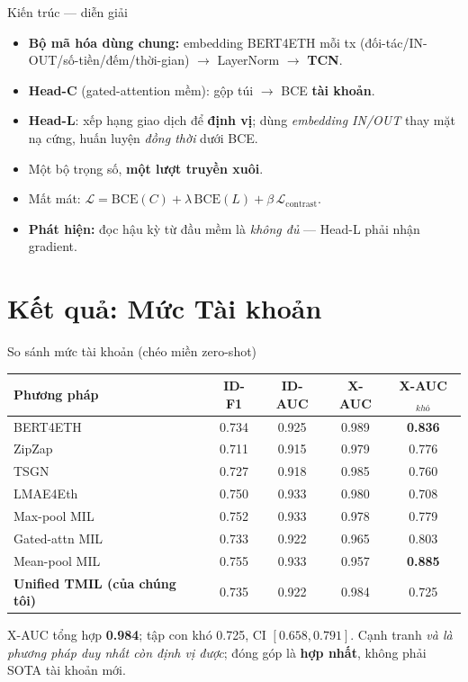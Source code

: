 \documentclass[aspectratio=169,10pt]{beamer}
\begin{document}
\begin{frame}{Kiến trúc --- diễn giải}
\begin{itemize}
\item \textbf{Bộ mã hóa dùng chung:} embedding BERT4ETH mỗi tx (đối-tác/IN-OUT/số-tiền/đếm/thời-gian) $\to$ LayerNorm $\to$ \textbf{TCN}.
\item \textbf{Head-C} (gated-attention mềm): gộp túi $\to$ BCE \textbf{tài khoản}.
\item \textbf{Head-L}: xếp hạng giao dịch để \textbf{định vị}; dùng \emph{embedding IN/OUT} thay mặt nạ cứng, huấn luyện \emph{đồng thời} dưới BCE.
\item Một bộ trọng số, \textbf{một lượt truyền xuôi}.
\item Mất mát: $\mathcal{L}=\mathrm{BCE}(C)+\lambda\,\mathrm{BCE}(L)+\beta\,\mathcal{L}_{\text{contrast}}$.
\item \textbf{Phát hiện:} đọc hậu kỳ từ đầu mềm là \emph{không đủ} --- Head-L phải nhận gradient.
\end{itemize}
\end{frame}

\section{Kết quả: Mức Tài khoản}
\begin{frame}{So sánh mức tài khoản (chéo miền zero-shot)}
\centering\small
\begin{tabular}{lcccc}\toprule
\textbf{Phương pháp} & \textbf{ID-F1} & \textbf{ID-AUC} & \textbf{X-AUC} & \textbf{X-AUC$_{khó}$}\\\midrule
BERT4ETH & 0.734 & 0.925 & 0.989 & \textbf{0.836}\\
ZipZap & 0.711 & 0.915 & 0.979 & 0.776\\
TSGN & 0.727 & 0.918 & 0.985 & 0.760\\
LMAE4Eth & 0.750 & 0.933 & 0.980 & 0.708\\
Max-pool MIL & 0.752 & 0.933 & 0.978 & 0.779\\
Gated-attn MIL & 0.733 & 0.922 & 0.965 & 0.803\\
Mean-pool MIL & 0.755 & 0.933 & 0.957 & \textbf{0.885}\\
\textbf{Unified TMIL (của chúng tôi)} & 0.735 & 0.922 & 0.984 & 0.725\\\bottomrule
\end{tabular}
\vfill
\footnotesize X-AUC tổng hợp \textbf{0.984}; tập con khó 0.725, CI $[0.658,0.791]$. Cạnh tranh \emph{và là phương pháp duy nhất còn định vị được}; đóng góp là \textbf{hợp nhất}, không phải SOTA tài khoản mới.
\end{frame}
\end{document}
